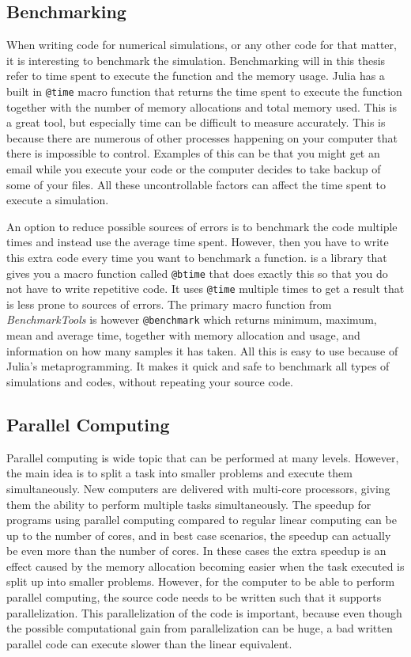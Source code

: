 \subsection{Benchmarking}
\label{sec:benchmarking}
When writing code for numerical simulations, or any other code for that matter, it is interesting to benchmark the simulation. Benchmarking will in this thesis refer to time spent to execute the function and the memory usage. Julia has a built in \texttt{@time} macro function \emph{\citep{@time}} that returns the time spent to execute the function together with the number of memory allocations and total memory used. This is a great tool, but especially time can be difficult to measure accurately. This is because there are numerous of other processes happening on your computer that there is impossible to control. Examples of this can be that you might get an email while you execute your code or the computer decides to take backup of some of your files. All these uncontrollable factors can affect the time spent to execute a simulation. 

An option to reduce possible sources of errors is to benchmark the code multiple times and instead use the average time spent. However, then you have to write this extra code every time you want to benchmark a function. \emph{\cite{BenchmarkTools}} is a library that gives you a macro function called \texttt{@btime} that does exactly this so that you do not have to write repetitive code. It uses \texttt{@time} multiple times to get a result that is less prone to sources of errors. The primary macro function from \textit{BenchmarkTools} is however \texttt{@benchmark} which returns minimum, maximum, mean and average time, together with memory allocation and usage, and information on how many samples it has taken. All this is easy to use because of Julia's metaprogramming. It makes it quick and safe to benchmark all types of simulations and codes, without repeating your source code.

\subsection{Parallel Computing}
\label{sec:parallelComputing}
Parallel computing is wide topic that can be performed at many levels. However, the main idea is to split a task into smaller problems and execute them simultaneously. New computers are delivered with multi-core processors, giving them the ability to perform multiple tasks simultaneously. The speedup for programs using parallel computing compared to regular linear computing can be up to the number of cores, and in best case scenarios, the speedup can actually be even more than the number of cores. In these cases the extra speedup is an effect caused by the memory allocation becoming easier when the task executed is split up into smaller problems. However, for the computer to be able to perform parallel computing, the source code needs to be written such that it supports parallelization. This parallelization of the code is important, because even though the possible computational gain from parallelization can be huge, a bad written parallel code can execute slower than the linear equivalent. 

